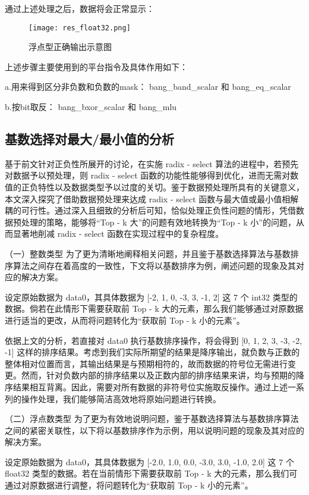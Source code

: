 通过上述处理之后，数据将会正常显示：

\begin{figure}[ht]
    \centering
    \texttt{[image: res\_float32.png]}
    \caption{浮点型正确输出示意图}
    \label{fig:res_float32}
\end{figure}


上述步骤主要使用到的平台指令及具体作用如下：

a.用来得到区分非负数和负数的mask： bang\_band\_scalar 和 bang\_eq\_scalar

b.按bit取反： bang\_bxor\_scalar 和 bang\_mlu

\subsection{基数选择对最大/最小值的分析}
基于前文针对正负性所展开的讨论，在实施 radix - select 算法的进程中，若预先对数据予以预处理，则 radix - select 函数的功能性能够得到优化，进而无需对数值的正负特性以及数据类型予以过度的关切。鉴于数据预处理所具有的关键意义，本文深入探究了借助数据预处理来达成 radix - select 函数与最大值或最小值相解耦的可行性。通过深入且细致的分析后可知，恰似处理正负性问题的情形，凭借数据预处理的策略，能够将“Top - k 大”的问题有效地转换为“Top - k 小”的问题，从而显著地削减 radix - select 函数在实现过程中的复杂程度。

（一）整数类型
为了更为清晰地阐释相关问题，并且鉴于基数选择算法与基数排序算法之间存在着高度的一致性，下文将以基数排序为例，阐述问题的现象及其对应的解决方案。

设定原始数据为 data0，其具体数据为 [-2, 1, 0, -3, 3, -1, 2] 这 7 个 int32 类型的数据。倘若在此情形下需要获取前 Top - k 大的元素，那么我们能够通过对原数据进行适当的更改，从而将问题转化为“获取前 Top - k 小的元素”。

依据上文的分析，若直接对 data0 执行基数排序操作，将会得到 [0, 1, 2, 3, -3, -2, -1] 这样的排序结果。考虑到我们实际所期望的结果是降序输出，就负数与正数的整体相对位置而言，其输出结果是与预期相符的，故而数据的符号位无需进行变更。然而，针对负数内部的排序结果以及正数内部的排序结果来讲，均与预期的降序结果相互背离。因此，需要对所有数据的非符号位实施取反操作。通过上述一系列的操作处理，我们能够简洁高效地将原始问题进行转换。

（二）浮点数类型
为了更为有效地说明问题，鉴于基数选择算法与基数排序算法之间的紧密关联性，以下将以基数排序作为示例，用以说明问题的现象及其对应的解决方案。

设定原始数据为 data0，其具体数据为 [-2.0, 1.0, 0.0, -3.0, 3.0, -1.0, 2.0] 这 7 个 float32 类型的数据。若在当前情形下需要获取前 Top - k 大的元素，那么我们可通过对原数据进行调整，将问题转化为“获取前 Top - k 小的元素”。

